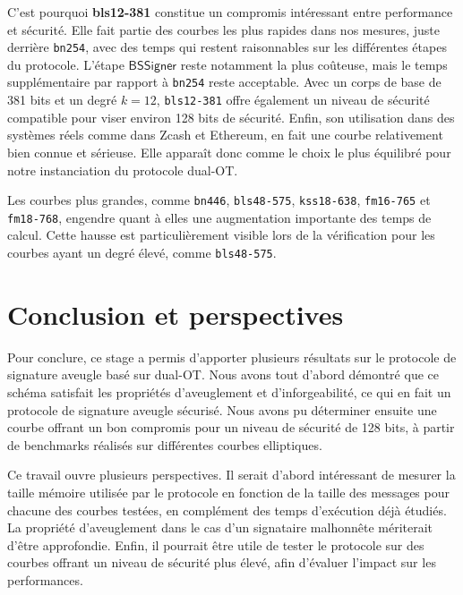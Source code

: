 \documentclass[10pt,a4paper]{article}
\theoremstyle{definition}
\theoremstyle{plain}
\theoremstyle{remark}
\begin{document}
C'est pourquoi \textbf{bls12-381} constitue un compromis intéressant entre performance et sécurité.
Elle fait partie des courbes les plus rapides dans nos mesures, juste derrière \texttt{bn254},
avec des temps qui restent raisonnables sur les différentes étapes du protocole.
L'étape $\mathsf{BSSigner}$ reste notamment la plus coûteuse, mais le temps supplémentaire par rapport à \texttt{bn254} reste acceptable. 
Avec un corps de base de 381 bits et un degré $k=12$, \texttt{bls12-381} offre également 
un niveau de sécurité compatible pour viser environ 128 bits de sécurité.
Enfin, son utilisation dans des systèmes réels comme dans Zcash et Ethereum,
en fait une courbe relativement bien connue et sérieuse. 
Elle apparaît donc comme le choix le plus équilibré pour notre instanciation du protocole dual-OT.

Les courbes plus grandes, comme \texttt{bn446}, \texttt{bls48-575}, \texttt{kss18-638}, \texttt{fm16-765} et \texttt{fm18-768},
engendre quant à elles une augmentation importante des temps de calcul. 
Cette hausse est particulièrement visible lors de la vérification pour les courbes ayant un degré élevé,
comme \texttt{bls48-575}. 


\newpage
\section{Conclusion et perspectives}

Pour conclure, ce stage a permis d'apporter plusieurs résultats sur le protocole de signature aveugle basé sur dual-OT.
Nous avons tout d'abord démontré que ce schéma satisfait les propriétés d'aveuglement et d'inforgeabilité, ce qui en fait un protocole de signature aveugle sécurisé.
Nous avons pu déterminer ensuite une courbe offrant un bon compromis pour un niveau de sécurité de 128 bits, à partir de benchmarks réalisés sur différentes courbes elliptiques.

Ce travail ouvre plusieurs perspectives. 
Il serait d'abord intéressant de mesurer la taille mémoire utilisée par le protocole en fonction de la taille des messages pour chacune des courbes testées, 
en complément des temps d'exécution déjà étudiés.
La propriété d'aveuglement dans le cas d'un signataire malhonnête mériterait d'être approfondie.
Enfin, il pourrait être utile de tester le protocole sur des courbes offrant un niveau de sécurité plus élevé, afin d'évaluer l'impact sur les performances.
\end{document}
